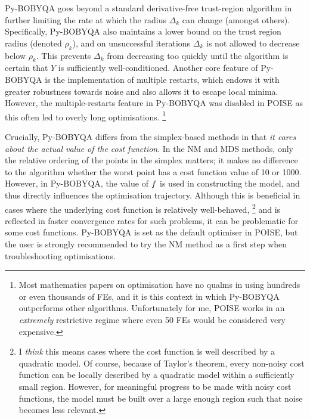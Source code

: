 Py-BOBYQA goes beyond a standard derivative-free trust-region algorithm in further limiting the rate at which the radius $\Delta_k$ can change (amongst others).
Specifically, Py-BOBYQA also maintains a lower bound on the trust region radius (denoted $\rho_k$), and on unsuccessful iterations $\Delta_k$ is not allowed to decrease below $\rho_k$.
This prevents $\Delta_k$ from decreasing too quickly until the algorithm is certain that $Y$ is sufficiently well-conditioned.\autocite{Powell2003MP}
Another core feature of Py-BOBYQA is the implementation of multiple restarts, which endows it with greater robustness towards noise and also allows it to escape local minima.\autocite{Cartis2019ACMTMS,Cartis2022O}
However, the multiple-restarts feature in Py-BOBYQA was disabled in POISE as this often led to overly long optimisations.%
\footnote{Most mathematics papers on optimisation have no qualms in using hundreds or even thousands of FEs, and it is this context in which Py-BOBYQA outperforms other algorithms. Unfortunately for me, POISE works in an \textit{extremely} restrictive regime where even 50 FEs would be considered very expensive.}

Crucially, Py-BOBYQA differs from the simplex-based methods in that \textit{it cares about the actual value of the cost function}.
In the NM and MDS methods, only the relative ordering of the points in the simplex matters; it makes no difference to the algorithm whether the worst point has a cost function value of 10 or 1000.
However, in Py-BOBYQA, the value of $f\/$ is used in constructing the model, and thus directly influences the optimisation trajectory.
Although this is beneficial in cases where the underlying cost function is relatively well-behaved,%
\footnote{I \textit{think} this means cases where the cost function is well described by a quadratic model. Of course, because of Taylor's theorem, every non-noisy cost function can be locally described by a quadratic model within a sufficiently small region. However, for meaningful progress to be made with noisy cost functions, the model must be built over a large enough region such that noise becomes less relevant.}
and is reflected in faster convergence rates for such problems, it can be problematic for some cost functions.
Py-BOBYQA is set as the default optimiser in POISE, but the user is strongly recommended to try the NM method as a first step when troubleshooting optimisations.
